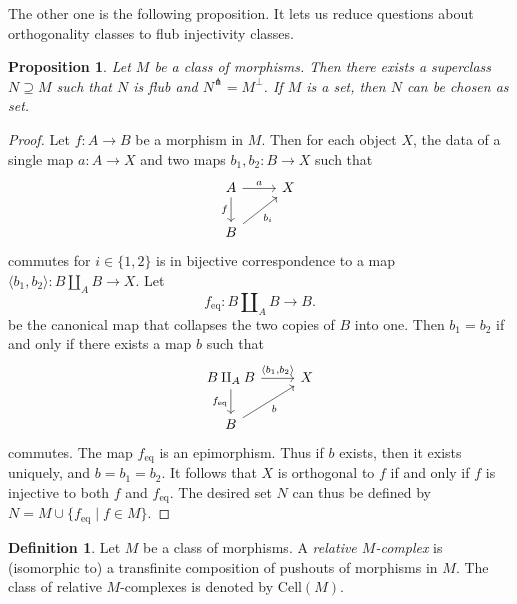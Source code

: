 \documentclass[a4paper]{article}
\newtheorem{proposition}[theorem]{Proposition}
\theoremstyle{remark}
\theoremstyle{definition}
\newtheorem{definition}[theorem]{Definition}
\begin{document}
The other one is the following proposition.
It lets us reduce questions about orthogonality classes to flub injectivity classes.
\begin{proposition}
	Let $M$ be a class of morphisms.
	Then there exists a superclass $N \supseteq M$ such that $N$ is flub and $N^\pitchfork = M^\perp$.
  If $M$ is a set, then $N$ can be chosen as set.
\end{proposition}
\begin{proof}
  Let $f : A \rightarrow B$ be a morphism in $M$.
  Then for each object $X$, the data of a single map $a : A \rightarrow X$ and two maps $b_1, b_2 : B \rightarrow X$ such that
  \begin{equation}
    \begin{tikzcd}
      A \arrow[r, "a"] \arrow[d, "f"'] & X \\
      B \arrow[ur, "b_i"'] &
    \end{tikzcd}
  \end{equation}
  commutes for $i \in \{1, 2\}$ is in bijective correspondence to a map $\langle b_1, b_2 \rangle : B \amalg_A B \rightarrow X$.
  Let
  \begin{equation}
    f_\mathrm{eq} : B \amalg_A B \rightarrow B.
  \end{equation}
  be the canonical map that collapses the two copies of $B$ into one.
  Then $b_1 = b_2$ if and only if there exists a map $b$ such that
  \begin{equation}
    \begin{tikzcd}
      B \amalg_A B \arrow[r, "{\langle b_1, b_2\rangle}"] \arrow[d, "f_\mathrm{eq}"'] & X \\
      B \arrow[ur, "b"'] &
    \end{tikzcd}
  \end{equation}
  commutes.
  The map $f_\mathrm{eq}$ is an epimorphism.
  Thus if $b$ exists, then it exists uniquely, and $b = b_1 = b_2$.
  It follows that $X$ is orthogonal to $f$ if and only if $f$ is injective to both $f$ and $f_\mathrm{eq}$.
  The desired set $N$ can thus be defined by $N = M \cup \{ f_\mathrm{eq} \mid f \in M \}$.
\end{proof}

\begin{definition}
  Let $M$ be a class of morphisms.
  A \emph{relative $M$-complex} is (isomorphic to) a transfinite composition of pushouts of morphisms in $M$.
  The class of relative $M$-complexes is denoted by $\mathrm{Cell}(M)$.
\end{definition}
\end{document}
